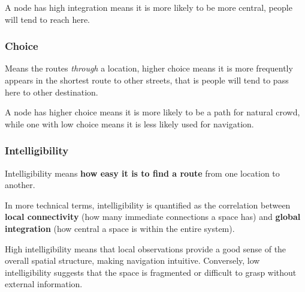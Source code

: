 \documentclass[a4paper, openany]{book}
\begin{document}
A node has high integration means it is more likely to be more central, people will tend to reach here.

\subsubsection{Choice}

Means the routes \textit{through} a location, higher choice means it is more frequently appears in the shortest route to other streets, that is people will tend to pass here to other destination.

A node has higher choice means it is more likely to be a path for natural crowd, while one with low choice means it is less likely used for navigation.

\subsubsection{Intelligibility}

Intelligibility means \textbf{how easy it is to find a route} from one location to another.

In more technical terms, intelligibility is quantified as the correlation between \textbf{local connectivity} (how many immediate connections a space has) and \textbf{global integration} (how central a space is within the entire system).

High intelligibility means that local observations provide a good sense of the overall spatial structure, making navigation intuitive. Conversely, low intelligibility suggests that the space is fragmented or difficult to grasp without external information.
\end{document}
